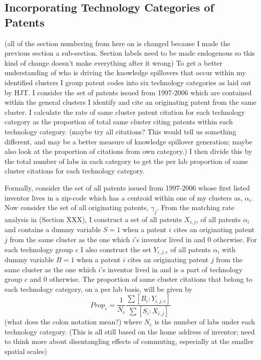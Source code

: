 \documentclass[12pt,letterpaper]{article}
\begin{document}
\subsection{Incorporating Technology Categories of Patents} {\color{red}(all of the section numbering from here on is changed because I made the previous section a sub-section. Section labels need to be made endogenous so this kind of change doesn't make everything after it wrong)}
To get a better understanding of who is driving the knowledge spillovers that occur within my identified clusters I group patent codes into six technology categories as laid out by HJT. I consider the set of patents issued from 1997-2006 which are contained within the general clusters I identify and cite an originating patent from the same cluster. I calculate the rate of same cluster patent citation for each technology category as the proportion of total same cluster citing patents within each technology category. {\color{blue}(maybe try all citations? This would tell us something different, and may be a better measure of knowledge spillover generation; maybe also look at the proportion of citations from own category.)} I then divide this by the total number of labs in each category to get the per lab proportion of same cluster citations for each technology category. 
\par 
Formally, consider the set of all patents issued from 1997-2006 whose first listed inventor lives in a zip-code which has a centroid within one of my clusters as, \(\alpha_i\). Now consider the set of all originating patents, \(\gamma_j\). From the matching rate analysis in {\color{red}(Section XXX)}, I construct a set of all patents \(X_{i,j}\), of all patents \(\alpha_i\) and contains a dummy variable \(S=1\) when a patent \(i\) cites an originating patent \(j\) from the same cluster as the one which \(i\)'s inventor lived in and 0 otherwise. For each technology group \(c\) I also construct the set \(Y_{i,j,c}\) of all patents \(\alpha_i\) with dummy variable \(B=1\) when a patent \(i\) cites an originating patent \(j\) from the same cluster as the one which \(i\)'s inventor lived in and is a part of technology group \(c\) and 0 otherwise. The proportion of same cluster citations that belong to each technology category, on a per lab basis, will be given by 
\begin{equation}
    Prop_c = \frac{1}{N_c}\frac{\sum [B_i:Y_{i,j,c}]}{\sum [S_i:X_{i,j}]}
\end{equation}
{\color{blue}(what does the colon notation mean?)} where \(N_c\) is the number of labs under each technology category. {\color{red}(This is all still based on the home address of inventor; need to think more about disentangling effects of commuting, especially at the smaller spatial scales)}
\end{document}
